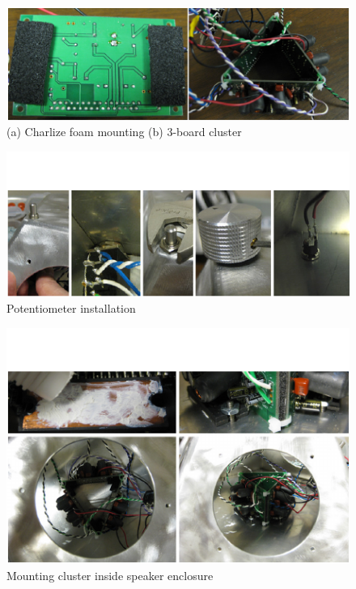 \begin{figure}[t]
\centering
\includegraphics[width=\textwidth]{img-14-eps-converted-to-crop.pdf}
\caption{(a) Charlize foam mounting (b) 3-board cluster}
\label{Smallwood:img-14}
\end{figure}


\begin{figure}[t]
\centering
\includegraphics[width=\textwidth]{img-15-eps-converted-to-crop.pdf}
\caption{Potentiometer installation }
\label{Smallwood:img-15}
\end{figure}


\begin{figure}[t]
\centering
\includegraphics[width=\textwidth]{img-16-eps-converted-to-crop.pdf}
\caption{Mounting cluster inside speaker enclosure}
\label{Smallwood:img-16}
\end{figure}


